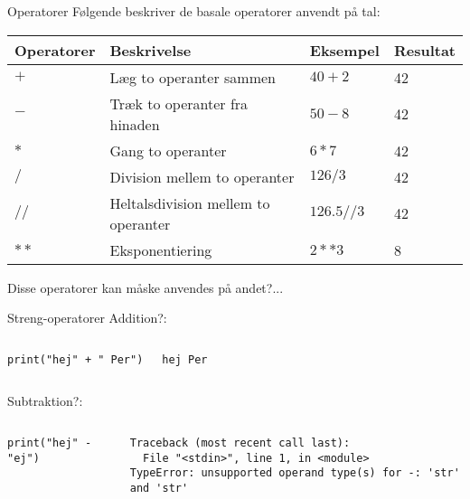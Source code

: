 \begin{frame}[fragile]{Operatorer}
	Følgende beskriver de basale operatorer anvendt på tal:
	\begin{center}
		\begin{tabular}{llll}
		\hline
		Operatorer			& 		Beskrivelse								&		Eksempel		&		Resultat	\\ \hline \hline
		$+$					&		Læg to operanter sammen					&		$40+2$			&		42			\\
		$-$					&		Træk to operanter fra hinaden			&		$50-8$			&		42			\\
		$*$					&		Gang to operanter 						&		$6*7$			&		42			\\
		$/$					&		Division mellem to operanter			&		$126/3$			&		42			\\
		$//$				&		Heltalsdivision mellem to operanter		&		$126.5//3$		&		42			\\
		$**$				&		Eksponentiering							&		$2**3$			&		8			\\
		\end{tabular}
	\end{center}
	\vfill
	\pause Disse operatorer kan måske anvendes på andet?...
\end{frame}


\begin{frame}[fragile]{Streng-operatorer}
	Addition?:
	\begin{columns}
		\begin{lstlisting}[style=python]
print("hej" + " Per")
		\end{lstlisting}
		\pause
		\begin{lstlisting}[style=python]
hej Per
		\end{lstlisting}
	\end{columns}
	\pause
	Subtraktion?:
	\begin{columns}
		\column{0.4\textwidth}
		\begin{lstlisting}[style=python]
print("hej" - "ej")
		\end{lstlisting}
		\pause
		\column{0.4\textwidth}
		\begin{lstlisting}[style=python]
Traceback (most recent call last):
  File "<stdin>", line 1, in <module>
TypeError: unsupported operand type(s) for -: 'str' and 'str'
		\end{lstlisting}
	\end{columns}
\end{frame}

